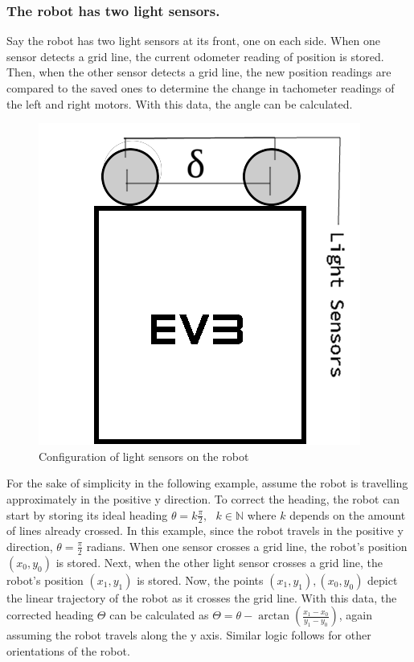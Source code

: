\documentclass[11pt]{article} %
\begin{document}
\subsubsection{The robot has two light sensors.}
Say the robot has two light sensors at its front, one on each side. When one sensor detects a grid
line, the current odometer reading of position is stored. Then, when the other sensor
detects a grid line, the new position readings are compared to the saved ones to determine the
change in tachometer readings of the left and right motors. With this data, the angle can be
calculated.
\begin{figure}[h!t]
	\begin{center}
		\caption{Configuration of light sensors on the robot}
		\includegraphics[scale=0.4]{2SensorDiagram}
	\end{center}
\end{figure}
For the sake of simplicity in the following example, assume the robot is travelling approximately in
the positive y direction. To correct the heading, the robot can start by storing its ideal heading
$\theta = k\frac{\pi}{2}, \mbox{ } k \in \mathbb{N}$ where $k$ depends on the amount of lines
already crossed. In this example, since the robot travels in the positive y direction, $\theta =
\frac{\pi}{2}$ radians. When one sensor crosses a
grid line, the robot's position $(x_0,y_0)$ is stored. Next, when the other light sensor crosses a
grid line, the robot's position $(x_1,y_1)$ is stored. Now, the points $(x_1,y_1),(x_0,y_0)$ depict
the linear trajectory of the robot as it crosses the grid line. With this data, the corrected heading
$\Theta$ can be calculated as $\Theta = \theta - \arctan(\frac{x_1 - x_0}{y_1 - y_0})$, again
assuming the robot travels along the y axis. Similar logic follows for other orientations of the
robot.
\end{document}
